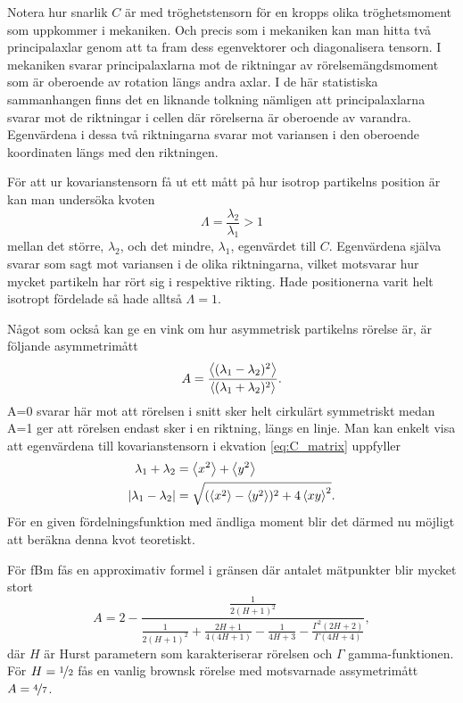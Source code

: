 Notera hur snarlik $C$ är med tröghetstensorn för en kropps olika tröghetsmoment som uppkommer i mekaniken. Och precis som i mekaniken kan man hitta två principalaxlar genom att ta fram dess egenvektorer och diagonalisera tensorn. I mekaniken svarar principalaxlarna mot de riktningar av rörelsemängdsmoment som är oberoende av rotation längs andra axlar. I de här statistiska sammanhangen finns det en liknande tolkning nämligen att principalaxlarna svarar mot de riktningar i cellen där rörelserna är oberoende av varandra. Egenvärdena i dessa två riktningarna svarar mot variansen i den oberoende koordinaten längs med den riktningen.


För att ur kovarianstensorn få ut ett mått på hur isotrop partikelns position är kan man undersöka kvoten
\begin{equation}
\varLambda = \frac{\lambda_2}{\lambda_1} >1
\end{equation}
mellan det större, $\lambda_2$, och det mindre, $\lambda_1$,  egenvärdet till $C$. Egenvärdena själva svarar som sagt mot variansen i de olika riktningarna, vilket motsvarar hur mycket partikeln har rört sig i respektive rikting. Hade positionerna varit helt isotropt fördelade så hade alltså $\varLambda=1$. 

Något som också kan ge en vink om hur asymmetrisk partikelns rörelse är, är följande asymmetrimått \cite{Hong_asymmetri1998}
\begin{equation}
A=\dfrac{\ev{(\lambda_1 - \lambda_2)^2}}{\ev{(\lambda_1 + \lambda_2)^2}}.
\end{equation}
A=0 svarar här mot att rörelsen i snitt sker helt cirkulärt symmetriskt medan A=1 ger att rörelsen endast sker i en riktning, längs en linje. Man kan enkelt visa att egenvärdena till kovarianstensorn i ekvation  \eqref{eq:C_matrix} uppfyller
\begin{align}
    \lambda_1+\lambda_2 &= \ev{x^2}+\ev{y^2} \\
    \abs{\lambda_1-\lambda_2} &= \sqrt{(\ev{x^2}-\ev{y^2})^2 + 4\ev{xy}^2}.
\end{align} %
För en given fördelningsfunktion med ändliga moment blir det därmed nu möjligt att beräkna denna kvot teoretiskt.

För fBm fås en approximativ formel i gränsen där antalet mätpunkter blir mycket stort
\begin{equation} \label{eq:A_fBm}
A=2-\frac{\frac{1}{2(H+1)^2}}{\frac{1}{2(H+1)^2}+\frac{2H+1}{4(4H+1)}-\frac{1}{4H+3}-\frac{\Gamma^2(2H+2)}{\Gamma(4H+4)}},
\end{equation}
där $H$ är Hurst parametern som karakteriserar rörelsen och $\Gamma$ gamma-funktionen. För $H=\nicefrac{1}{2}$ fås en vanlig brownsk rörelse med motsvarnade  assymetrimått $A=\nicefrac{4}{7}$.

